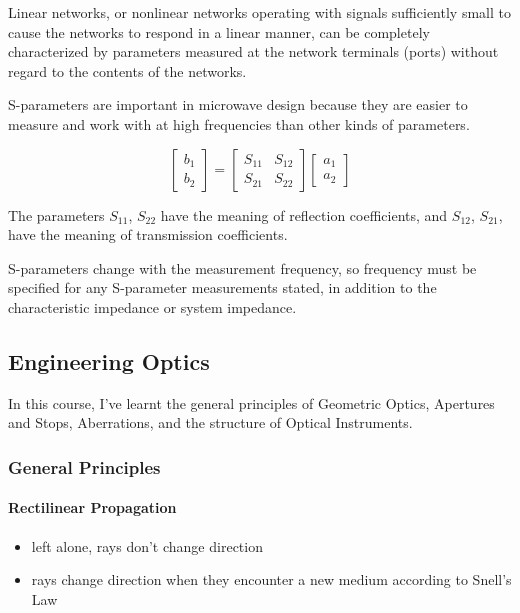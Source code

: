 Linear networks, or nonlinear networks operating with signals sufficiently small to cause the networks to respond in a linear manner, can be completely characterized by parameters measured at the network terminals (ports) without regard to the contents of the networks.

S-parameters are important in microwave design because they are easier to measure and work with at high frequencies than other kinds of parameters.

\[
\begin{bmatrix}
   b_1 \\
   b_2
\end{bmatrix}
=
\begin{bmatrix}
   S_{11} & S_{12} \\
   S_{21} & S_{22}
\end{bmatrix}
\begin{bmatrix}
   a_1 \\
   a_2
\end{bmatrix}
\]

The parameters $S_{11}$, $S_{22}$ have the meaning of reflection coefficients, and $S_{12}$, $S_{21}$, have the meaning of transmission coefficients.

S-parameters change with the measurement frequency, so frequency must be specified for any S-parameter measurements stated, in addition to the characteristic impedance or system impedance.

\subsection{Engineering Optics}
In this course, I've learnt the general principles of Geometric Optics, Apertures and Stops, Aberrations, and the structure of Optical Instruments.

\subsubsection{General Principles}

\paragraph{Rectilinear Propagation}
\begin{itemize}
  \item left alone, rays don't change direction
  \item rays change direction when they encounter a new medium according to Snell's Law
\end{itemize}

